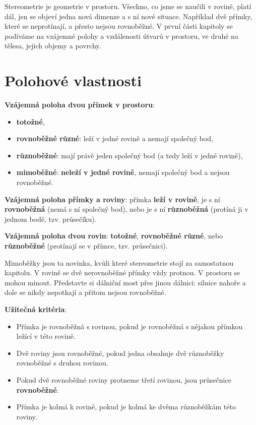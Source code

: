 \label{kap:stereometrie}

Stereometrie je geometrie v prostoru. Všechno, co jsme se naučili v rovině, platí dál, jen se objeví jedna nová dimenze a s ní nové situace. Například dvě přímky, které se neprotínají, a přesto nejsou rovnoběžné. V první části kapitoly se podíváme na vzájemné polohy a vzdálenosti útvarů v prostoru, ve druhé na tělesa, jejich objemy a povrchy.

\section{Polohové vlastnosti}\label{sec:polohove-vlastnosti}

\begin{definitionbox}
  \textbf{Vzájemná poloha dvou přímek v prostoru}:
  \begin{itemize}
    \item \textbf{totožné},
    \item \textbf{rovnoběžné různé}: leží v jedné rovině a nemají společný bod,
    \item \textbf{různoběžné}: mají právě jeden společný bod (a tedy leží v jedné rovině),
    \item \textbf{mimoběžné}: \textbf{neleží v jedné rovině}, nemají společný bod a nejsou rovnoběžné.
  \end{itemize}

  \textbf{Vzájemná poloha přímky a roviny}: přímka \textbf{leží v rovině}, je s ní \textbf{rovnoběžná} (nemá s ní společný bod), nebo je s ní \textbf{různoběžná} (protíná ji v jednom bodě, tzv. průsečíku).

  \textbf{Vzájemná poloha dvou rovin}: \textbf{totožné}, \textbf{rovnoběžné různé}, nebo \textbf{různoběžné} (protínají se v přímce, tzv. průsečnici).
\end{definitionbox}

Mimoběžky jsou ta novinka, kvůli které stereometrie stojí za samostatnou kapitolu. V rovině se dvě nerovnoběžné přímky vždy protnou. V prostoru se mohou minout. Představte si dálniční most přes jinou dálnici: silnice nahoře a dole se nikdy nepotkají a přitom nejsou rovnoběžné.

\begin{definitionbox}
  \textbf{Užitečná kritéria}:
  \begin{itemize}
    \item Přímka je rovnoběžná s rovinou, pokud je rovnoběžná s nějakou přímkou ležící v této rovině.
    \item Dvě roviny jsou rovnoběžné, pokud jedna obsahuje dvě různoběžky rovnoběžné s druhou rovinou.
    \item Pokud dvě rovnoběžné roviny protneme třetí rovinou, jsou průsečnice \textbf{rovnoběžné}.
    \item Přímka je kolmá k rovině, pokud je kolmá ke dvěma různoběžkám této roviny.
  \end{itemize}
\end{definitionbox}

